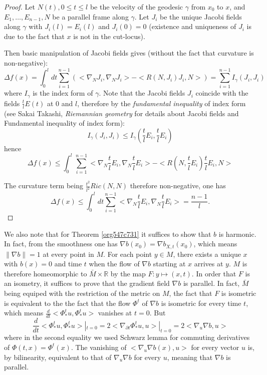 \documentclass[11pt]{article}
\begin{document}
\begin{proof}
Let \(N(t), 0\leq t \leq l\) be the velocity of the geodesic \(\gamma\) from \(x_0\) to \(x\), and
\(E_1,\dots, E_{n-1},N\) be a parallel frame along \(\gamma\). Let \(J_i\) be the unique Jacobi
fields along \(\gamma\) with \(J_i(l) = E_i(l)\) and \(J_i(0)=0\) (existence and uniqueness of \(J_i\) is
due to the fact that \(x\) is not in the cut-locus).

Then basic manipulation of Jacobi fields gives (without the fact that curvature is non-negative):
\[
\Delta f(x) = \int_0^l dt \sum_{i=1}^{n-1}\left(<\nabla_N J_i, \nabla_N J_i> - < R(N,J_i)J_i,N >\right) = \sum_{i=1}^{n-1} I_\gamma(J_i,J_i)
\]
where \(I_\gamma\) is the index form of \(\gamma\). Note that the Jacobi fields \(J_i\) coincide with the
fields \(\frac{t}{l}E(t)\) at \(0\) and \(l\), therefore by the \emph{fundamental inequality} of index form
(see Sakai Takashi, \emph{Riemannian geometry} for details about Jacobi fields and Fundamental inequality
of index form):
\[
I_\gamma(J_i,J_i)\leq I_\gamma(\frac{t}{l}E_i,\frac{t}{l}E_i)
\]
hence
\[
\Delta f(x) \leq \int_0^l \sum_{i=1}^{n-1}<\nabla_N \frac{t}{l}E_i, \nabla_N \frac{t}{l}E_i> -
< R(N,\frac{t}{l}E_i)\frac{t}{l}E_i,N >
\]

The curvature term being \(\frac{t^2}{l^2}Ric(N,N)\) therefore non-negative, one has
\[
\Delta f(x) \leq \int_0^l dt \sum_{i=1}^{n-1}<\nabla_N \frac{t}{l}E_i, \nabla_N \frac{t}{l}E_i> = \frac{n-1}{l}.
\]
\end{proof}


We also note that for Theorem \ref{org547c731} it suffices to show that \(b\) is harmonic. In fact,
from the smoothness one has \(\nabla b(x_0) =\nabla b_{X,t}(x_0)\), which means \(\|\nabla b\| = 1\) at
every point in \(M\).  For each point \(y\in M\), there exists a unique \(x\) with \(b(x)=0\) and time \(t\)
when the flow of \(\nabla b\) starting at \(x\) arrives at \(y\). \(M\) is therefore homeomorphic to \(\bar
M\times \mathbb{R}\) by the map \(F: y\mapsto (x,t)\). In order that \(F\) is an isometry, it suffices to
prove that the gradient field \(\nabla b\) is parallel. In fact, \(\bar M\) being equiped with the
restriction of the metric on \(M\), the fact that \(F\) is isometric is equivalent to the the fact that
the flow \(\Phi^t\) of \(\nabla b\) is isometric for every time \(t\), which means \(\frac{d}{dt}
<\Phi_*^t u, \Phi_*^t u>\) vanishes at \(t=0\). But 
\[ 
\frac{d}{dt}<\Phi_*^t u,\Phi_*^t u>|_{t=0} = 2<\nabla_{\partial t}\Phi_*^t u, u>|_{t=0} = 2<\nabla_u \nabla b,u> 
\] 
where in the second equality we used Schwarz lemma for commuting derivatives of \(\Phi(t,x) = \Phi^t(x)\). The vanishing of \(<\nabla_u \nabla b(x),u>\) for
every vector \(u\) is, by bilinearity, equivalent to that of \(\nabla_u \nabla b\) for every \(u\),
meaning that \(\nabla b\) is parallel.
\end{document}
